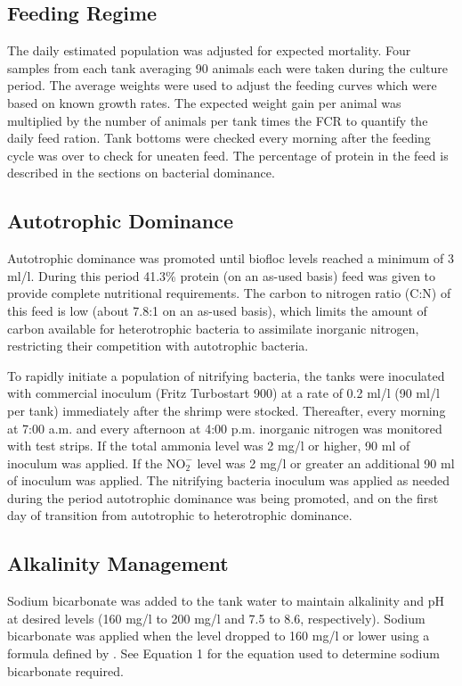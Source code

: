 \documentclass[useAMS,usenatbib]{tellus}
\begin{document}
\subsection{Feeding Regime}
\noindent The daily estimated population was adjusted for expected mortality. Four samples from each tank averaging 90 animals each were taken during the culture period.  The average weights were used to adjust the feeding curves which were based on known growth rates.  The expected weight gain per animal was multiplied by the number of animals per tank times the FCR to quantify the daily feed ration. Tank bottoms were checked every morning after the feeding cycle was over to check for uneaten feed. The percentage of protein in the feed is described in the sections on bacterial dominance.

\subsection{Autotrophic Dominance}
Autotrophic dominance was promoted until biofloc levels reached a minimum of 3 ml/l.  During this period 41.3\% protein (on an as-used basis) feed was given to provide complete nutritional requirements. The carbon to nitrogen ratio (C:N) of this feed is low (about 7.8:1 on an as-used basis), which limits the amount of carbon available for heterotrophic bacteria to assimilate inorganic nitrogen, restricting their competition with autotrophic bacteria.    

To rapidly initiate a population of nitrifying bacteria, the tanks were inoculated with commercial inoculum (Fritz Turbostart 900) at a rate of 0.2 ml/l (90 ml/l per tank) immediately after the shrimp were stocked. Thereafter, every morning at 7:00 a.m. and every afternoon at 4:00 p.m. inorganic nitrogen was monitored with test strips. If the total ammonia level was 2 mg/l or higher, 90 ml of inoculum was applied. If the $\text{NO}_2^-$ level was 2 mg/l or greater an additional 90 ml of inoculum was applied. The nitrifying bacteria inoculum was applied as needed during the period autotrophic dominance was being promoted, and on the first day of transition from autotrophic to heterotrophic dominance.

\subsection{Alkalinity Management}
\noindent Sodium bicarbonate was added to the tank water to maintain alkalinity and pH at desired levels (160 mg/l to 200 mg/l and 7.5 to 8.6, respectively). Sodium bicarbonate was applied when the level dropped to 160 mg/l or lower using a formula defined by \citet{cro+al2012}.  See Equation 1 for the equation used to determine sodium bicarbonate required.\par
\end{document}
